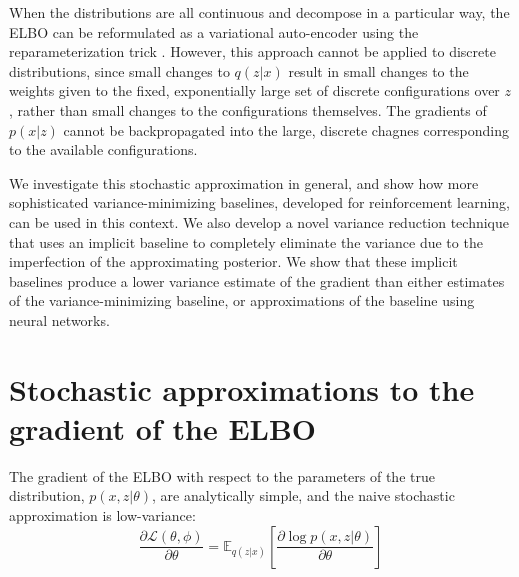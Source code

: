 \documentclass{article} %
\begin{document}
When the distributions are all continuous and decompose in a particular way, the ELBO can be reformulated as a variational auto-encoder using the reparameterization trick \cite{kingma2013auto}.  However, this approach cannot be applied to discrete distributions, since small changes to $q(z|x)$ result in small changes to the weights given to the fixed, exponentially large set of discrete configurations over $z$, rather than small changes to the configurations themselves.  The gradients of $p(x | z)$ cannot be backpropagated into the large, discrete chagnes corresponding to the available configurations.

We investigate this stochastic approximation in general, and show how more sophisticated variance-minimizing baselines, developed for reinforcement learning, can be used in this context.  We also develop a novel variance reduction technique that uses an implicit baseline to completely eliminate the variance due to the imperfection of the approximating posterior.  We show that these implicit baselines produce a lower variance estimate of the gradient than either estimates of the variance-minimizing baseline, or approximations of the baseline using neural networks.  

\section{Stochastic approximations to the gradient of the ELBO}

The gradient of the ELBO with respect to the parameters of the true distribution, $p(x,z|\theta)$, are analytically simple, and the naive stochastic approximation is low-variance:
\begin{equation*}
\frac{\partial \mathcal{L}(\theta, \phi)}{\partial \theta} = \mathbb{E}_{q(z|x)} \left[ \frac{\partial \log p(x,z | \theta)}{\partial \theta} \right]
\end{equation*}
\end{document}
